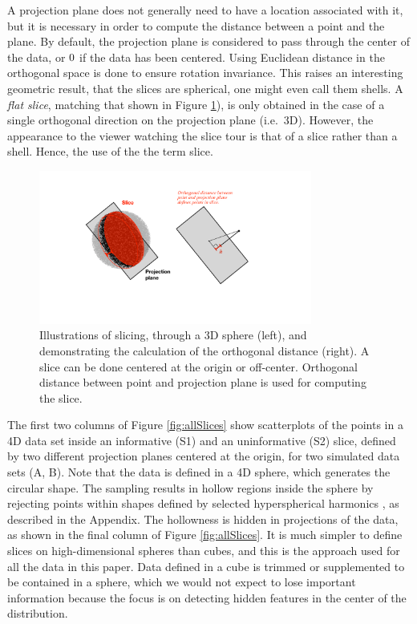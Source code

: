 \documentclass[]{interact}
\theoremstyle{plain}%
\theoremstyle{definition}
\theoremstyle{remark}
\begin{document}
A projection plane does not generally need to have a location associated
with it, but it is necessary in order to compute the distance between a
point and the plane. By default, the projection plane is considered to
pass through the center of the data, or \(\boldmath{0}\) if the data has
been centered. Using Euclidean distance in the orthogonal space is done
to ensure rotation invariance. This raises an interesting geometric
result, that the slices are spherical, one might even call them shells.
A \textit{flat slice}, matching that shown in Figure
\ref{fig:diagrams}), is only obtained in the case of a single orthogonal
direction on the projection plane (i.e.~3D). However, the appearance to
the viewer watching the slice tour is that of a slice rather than a
shell. Hence, the use of the the term slice.

\begin{figure}[ht]
\centerline{\includegraphics[width=0.8\textwidth]{diagrams/slice.pdf}}
\caption{Illustrations of slicing, through a 3D sphere (left), and demonstrating the calculation of the orthogonal distance (right). A slice can be done centered at the origin or off-center. Orthogonal distance between point and projection plane is used for computing the slice.}
\label{fig:diagrams}
\end{figure}

The first two columns of Figure \ref{fig:allSlices} show scatterplots of
the points in a 4D data set inside an informative (S1) and an
uninformative (S2) slice, defined by two different projection planes
centered at the origin, for two simulated data sets (A, B). Note that
the data is defined in a 4D sphere, which generates the circular shape.
The sampling results in hollow regions inside the sphere by rejecting
points within shapes defined by selected hyperspherical harmonics
\citep{doi:10.1063/1.3054274}, as described in the Appendix. The
hollowness is hidden in projections of the data, as shown in the final
column of Figure \ref{fig:allSlices}. It is much simpler to define
slices on high-dimensional spheres than cubes, and this is the approach
used for all the data in this paper. Data defined in a cube is trimmed
or supplemented to be contained in a sphere, which we would not expect
to lose important information because the focus is on detecting hidden
features in the center of the distribution.
\end{document}

